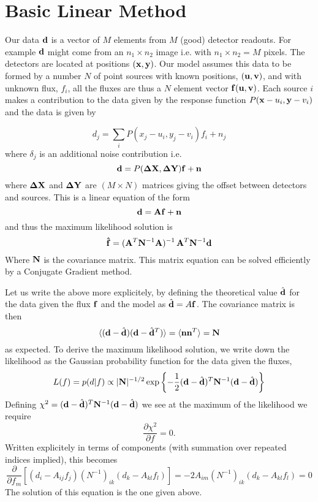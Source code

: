 \documentclass{article}
\begin{document}
\section{Basic Linear Method}
Our data ${\bf d}$ is a vector of $M$ elements from $M$ (good) detector readouts. For example ${\bf d}$ might come from an $n_1\times n_2$ image i.e. with $n_1\times n_2=M$ pixels.  The detectors are located at positions $({\bf x,y})$.  Our model assumes this data to be formed by a number $N$ of point sources with known positions,  ${\bf (u,v)}$, and with unknown flux, $f_i$, all the fluxes are thus a $N$ element vector ${\bf f(u,v)}$.  Each source $i$ makes a contribution to the data given by the response function $P({\bf x}-u_i, {\bf y}-v_i)$ and the data is given by

\begin{equation}
d_j=\sum_i{P(x_j-u_i, y_j-v_i)}f_i+n_j \label{eqn:lin1}
\end{equation}
where $\delta_j$ is an additional noise contribution
i.e.
\begin{equation}
{\bf d}=P({\bf \Delta X},{\bf \Delta Y}){\bf f}+{\bf n}
\label{eqn:linprf}\end{equation}
where ${\bf {\Delta X}}$ and ${\bf \Delta Y}$ are $(M\times N)$ matrices giving the offset between detectors and sources.  This is a linear equation of the form
\begin{equation}
 {\bf d}={\bf A}{\bf f}+{\bf n}\label{eqn:matrix}
\end{equation}
and thus the maximum likelihood solution is
\begin{equation}
{\bf \hat{f}}=({\bf A}^T{\bf N}^{-1}{\bf A})^{-1}\, {\bf A}^T{\bf N}^{-1}{\bf 
d}
\end{equation}
Where ${\bf N}$ is the covariance matrix. This matrix equation can be solved
efficiently by a Conjugate Gradient method.

Let us write the above more explicitely, by defining the theoretical
value $\hat{\bf d}$ for the data given the flux ${\bf f}$ and the model
as $\hat{\bf d} = A {\bf f}$. The covariance matrix is then
\[
\langle ({\bf d}-\hat{\bf d}) ({\bf d}-\hat{\bf d}^T)\rangle 
= \langle {\bf n} {\bf n}^T \rangle 
= {\bf N}
\]
as expected. To derive the maximum likelihood solution, we write down the
likelihood as the Gaussian probability function for the data given the fluxes,
\[
L(f) = p(d|f) \propto |{\bf N}|^{-1/2} 
\exp\left\{-\frac{1}{2}({\bf d}-\hat{\bf d})^T {\bf N}^{-1} ({\bf d}-\hat{\bf d}) \right\}
\]
Defining $\chi^2=({\bf d}-\hat{\bf d})^T {\bf N}^{-1} ({\bf d}-\hat{\bf d})$ we
see at the maximum of the likelihood we require
\[
\frac{\partial \chi^2}{\partial f} = 0 .
\]
Written explicitely in terms of components (with summation over repeated indices
implied), this becomes
\[
\frac{\partial}{\partial f_m} \left[ (d_i-A_{ij} f_j) (N^{-1})_{ik} (d_k-A_{kl} f_l) \right]
= -2 A_{im} (N^{-1})_{ik}(d_k-A_{kl} f_l) = 0
\]
The solution of this equation is the one given above.
\end{document}

